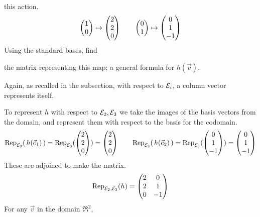 \begin{exercises}
    this action.
    \begin{equation*}
      \colvec{1 \\ 0}\mapsto\colvec{2 \\ 2 \\ 0}
      \qquad
      \colvec{0 \\ 1}\mapsto\colvec{0 \\ 1 \\ -1}
    \end{equation*}
    Using the standard bases, find
    \begin{exparts}
      \partsitem the matrix representing this map;
      \partsitem a general formula for \( h(\vec{v}) \).
    \end{exparts}
    \begin{answer}
      Again, as recalled in the subsection, 
      with respect to $\stdbasis_i$, a column vector represents itself.
      \begin{exparts}
        \partsitem To represent \( h \) with respect 
          to \( \stdbasis_2,\stdbasis_3 \) we take 
          the images of the basis vectors from the domain,
          and represent them with respect to the basis for the codomain.
          \begin{equation*}
            \rep{\,h(\vec{e}_1)\,}{\stdbasis_3}
            =\rep{\colvec{2 \\ 2 \\ 0}}{\stdbasis_3}
            =\colvec{2 \\ 2 \\ 0}
            \qquad
            \rep{\,h(\vec{e}_2)\,}{\stdbasis_3}
            =\rep{\colvec{0 \\ 1 \\ -1}}{\stdbasis_3}
            =\colvec{0 \\ 1 \\ -1}
          \end{equation*}
          These are adjoined to make the matrix.
          \begin{equation*}
            \rep{h}{\stdbasis_2,\stdbasis_3}=
            \begin{pmatrix}
              2  &0  \\
              2  &1  \\
              0  &-1
            \end{pmatrix}
          \end{equation*}
        \partsitem For any \( \vec{v} \) in the domain \( \Re^2 \),
          \begin{equation*}

\end{equation*}
\end{exparts}
\end{answer}
\end{exercises}
